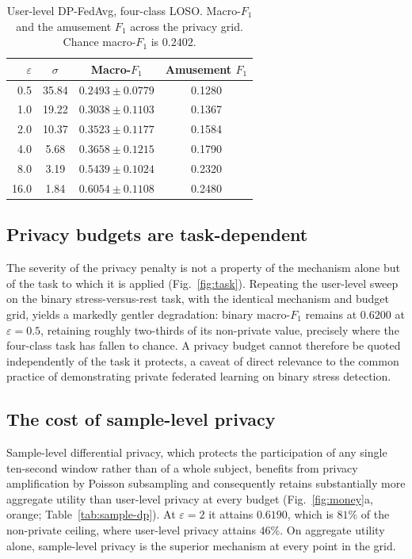 \begin{table}[t]
\centering
\caption{User-level DP-FedAvg, four-class LOSO. Macro-$F_1$ and the amusement
$F_1$ across the privacy grid. Chance macro-$F_1$ is $0.2402$.}
\label{tab:user-dp}
\begin{tabular}{rccc}
\toprule
$\varepsilon$ & $\sigma$ & Macro-$F_1$ & Amusement $F_1$ \\
\midrule
0.5  & 35.84 & $0.2493 \pm 0.0779$ & 0.1280 \\
1.0  & 19.22 & $0.3038 \pm 0.1103$ & 0.1367 \\
2.0  & 10.37 & $0.3523 \pm 0.1177$ & 0.1584 \\
4.0  &  5.68 & $0.3658 \pm 0.1215$ & 0.1790 \\
8.0  &  3.19 & $0.5439 \pm 0.1024$ & 0.2320 \\
16.0 &  1.84 & $0.6054 \pm 0.1108$ & 0.2480 \\
\bottomrule
\end{tabular}
\end{table}

\subsection{Privacy budgets are task-dependent}
\label{sec:results-task}

The severity of the privacy penalty is not a property of the mechanism alone but
of the task to which it is applied (Fig.~\ref{fig:task}). Repeating the
user-level sweep on the binary stress-versus-rest task, with the identical
mechanism and budget grid, yields a markedly gentler degradation: binary
macro-$F_1$ remains at $0.6200$ at $\varepsilon = 0.5$, retaining roughly
two-thirds of its non-private value, precisely where the four-class task has
fallen to chance. A privacy budget cannot therefore be quoted independently of
the task it protects, a caveat of direct relevance to the common practice of
demonstrating private federated learning on binary stress detection.

\subsection{The cost of sample-level privacy}
\label{sec:results-sample-dp}

Sample-level differential privacy, which protects the participation of any single
ten-second window rather than of a whole subject, benefits from privacy
amplification by Poisson subsampling and consequently retains substantially more
aggregate utility than user-level privacy at every budget
(Fig.~\ref{fig:money}a, orange; Table~\ref{tab:sample-dp}). At $\varepsilon = 2$
it attains $0.6190$, which is $81\%$ of the non-private ceiling, where user-level
privacy attains $46\%$. On aggregate utility alone, sample-level privacy is the
superior mechanism at every point in the grid.


